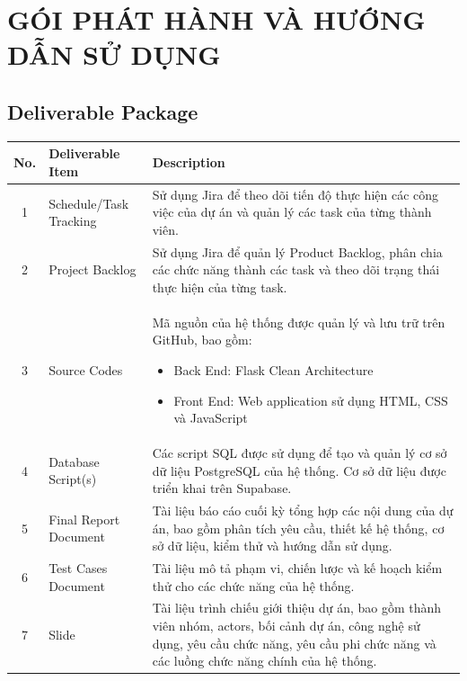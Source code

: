 \chapter{GÓI PHÁT HÀNH VÀ HƯỚNG DẪN SỬ DỤNG}

\section{Deliverable Package}

\begin{longtable}{|c|p{4cm}|p{8cm}|}
	\hline
	\textbf{No.} & \textbf{Deliverable Item} & \textbf{Description} \\ 
	\hline
	1 & Schedule/Task Tracking &
	Sử dụng Jira để theo dõi tiến độ thực hiện các công việc của dự án và quản lý các task của từng thành viên. \\
	\hline
	
	2 & Project Backlog &
	Sử dụng Jira để quản lý Product Backlog, phân chia các chức năng thành các task và theo dõi trạng thái thực hiện của từng task. \\
	\hline
	
	3 & Source Codes &
	Mã nguồn của hệ thống được quản lý và lưu trữ trên GitHub, bao gồm:
	\begin{itemize}
		\item Back End: Flask Clean Architecture
		\item Front End: Web application sử dụng HTML, CSS và JavaScript
	\end{itemize}
	\\
	\hline
	
	4 & Database Script(s) &
	Các script SQL được sử dụng để tạo và quản lý cơ sở dữ liệu PostgreSQL của hệ thống. Cơ sở dữ liệu được triển khai trên Supabase. \\
	\hline
	
	5 & Final Report Document &
	Tài liệu báo cáo cuối kỳ tổng hợp các nội dung của dự án, bao gồm phân tích yêu cầu, thiết kế hệ thống, cơ sở dữ liệu, kiểm thử và hướng dẫn sử dụng. \\
	\hline
	
	6 & Test Cases Document &
	Tài liệu mô tả phạm vi, chiến lược và kế hoạch kiểm thử cho các chức năng của hệ thống. \\
	\hline
	
	7 & Slide &
	Tài liệu trình chiếu giới thiệu dự án, bao gồm thành viên nhóm, actors, bối cảnh dự án, công nghệ sử dụng, yêu cầu chức năng, yêu cầu phi chức năng và các luồng chức năng chính của hệ thống. \\
	\hline
	
\end{longtable}

